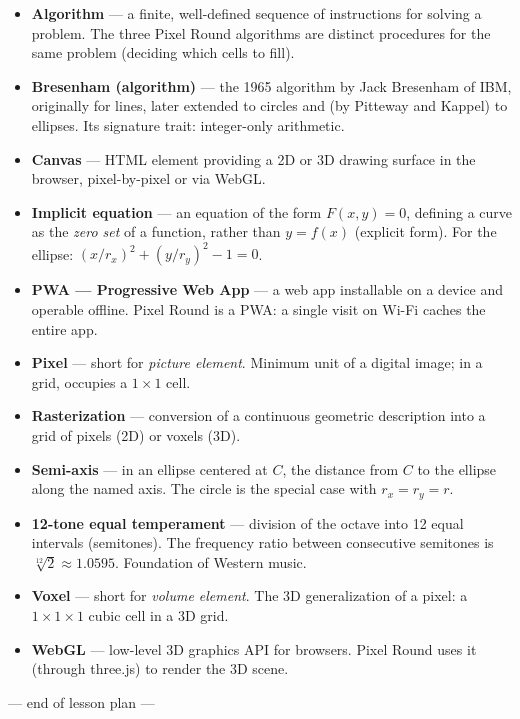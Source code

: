 \documentclass[12pt,letterpaper]{scrartcl}
\newcommand{\acc}[1]{\textcolor{accent}{\textbf{#1}}}
\begin{document}
\begin{itemize}[leftmargin=1.4em,itemsep=0.3em,topsep=0.3em]
  \item \acc{Algorithm} --- a finite, well-defined sequence of instructions for solving a problem. The three Pixel Round algorithms are distinct procedures for the same problem (deciding which cells to fill).
  \item \acc{Bresenham (algorithm)} --- the 1965 algorithm by Jack Bresenham of IBM, originally for lines, later extended to circles and (by Pitteway and Kappel) to ellipses. Its signature trait: integer-only arithmetic.
  \item \acc{Canvas} --- HTML element providing a 2D or 3D drawing surface in the browser, pixel-by-pixel or via WebGL.
  \item \acc{Implicit equation} --- an equation of the form $F(x, y) = 0$, defining a curve as the \emph{zero set} of a function, rather than $y = f(x)$ (explicit form). For the ellipse: $(x/r_x)^2 + (y/r_y)^2 - 1 = 0$.
  \item \acc{PWA --- Progressive Web App} --- a web app installable on a device and operable offline. Pixel Round is a PWA: a single visit on Wi-Fi caches the entire app.
  \item \acc{Pixel} --- short for \emph{picture element}. Minimum unit of a digital image; in a grid, occupies a $1 \times 1$ cell.
  \item \acc{Rasterization} --- conversion of a continuous geometric description into a grid of pixels (2D) or voxels (3D).
  \item \acc{Semi-axis} --- in an ellipse centered at $C$, the distance from $C$ to the ellipse along the named axis. The circle is the special case with $r_x = r_y = r$.
  \item \acc{12-tone equal temperament} --- division of the octave into 12 equal intervals (semitones). The frequency ratio between consecutive semitones is $\sqrt[12]{2} \approx 1.0595$. Foundation of Western music.
  \item \acc{Voxel} --- short for \emph{volume element}. The 3D generalization of a pixel: a $1 \times 1 \times 1$ cubic cell in a 3D grid.
  \item \acc{WebGL} --- low-level 3D graphics API for browsers. Pixel Round uses it (through three.js) to render the 3D scene.
\end{itemize}

\vspace{2em}
\begin{center}
\color{muted}\small\sffamily
--- end of lesson plan ---
\end{center}
\end{document}
